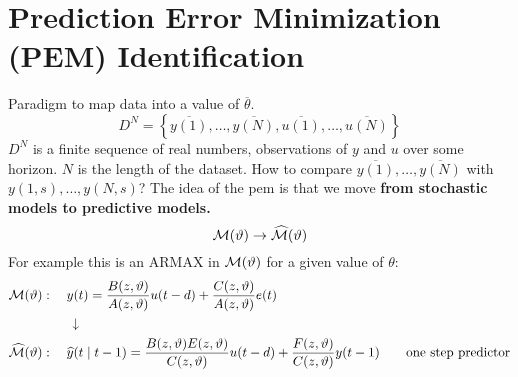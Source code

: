 \section{Prediction Error Minimization (PEM) Identification}

Paradigm to map data into a value of $\overline{\theta}$.
$$
	D^N=\left\{\overline{y(1)},\ldots,\overline{y(N)},\overline{u(1)},\ldots,\overline{u(N)}\right\}
$$
$D^N$ is a finite sequence of real numbers, observations of $y$ and $u$ over some horizon. $N$ is the length of the dataset.
How to compare $\overline{y(1)},\ldots,\overline{y(N)}$ with $y(1,s),\ldots,y(N,s)$?
The idea of the \gls{pem} is that we move \textbf{from stochastic models to predictive models.}
\[
	\mathcal{M}(\vartheta) \to \widehat{\mathcal{M}}(\vartheta)
\]
For example this is an ARMAX in $\mathcal{M}(\vartheta)$ for a given value of $\theta$:
\begin{align*}
	\mathcal{M}(\vartheta)&:\quad y(t)=\frac{B(z, \vartheta)}{A(z, \vartheta)} u(t-d)+\frac{C(z, \vartheta)}{A(z, \vartheta)} e(t)\\
	&\qquad\downarrow\\
	\widehat{\mathcal{M}}(\vartheta)&: \quad \widehat{y}(t \mid t-1) =\frac{B(z,\vartheta) E(z,\vartheta)}{C(z,\vartheta)} u(t-d)+\frac{F(z,\vartheta)}{C(z,\vartheta)} y(t-1) \qquad \text{one step predictor}
\end{align*}
